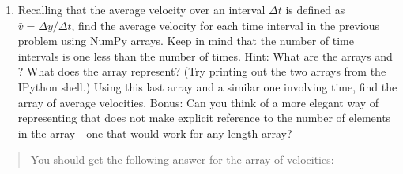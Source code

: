\documentclass[letterpaper,10pt,english]{sphinxmanual}
\begin{document}
\begin{enumerate}
\item {} 
\sphinxAtStartPar
Recalling that the average velocity over an interval \(\Delta t\) is defined as \(\bar{v} = \Delta y/\Delta t\), find the average velocity for each time interval in the previous problem using NumPy arrays.  Keep in mind that the number of time intervals is one less than the number of times.  Hint: What are the arrays  and ?  What does the array  represent?  (Try printing out the two arrays from the IPython shell.) Using this last array and a similar one involving time, find the array of average velocities.  Bonus: Can you think of a more elegant way of representing  that does not make explicit reference to the number of elements in the  array—one that would work for any length array?

\end{enumerate}
\begin{quote}

\sphinxAtStartPar
You should get the following answer for the array of velocities:
\begin{quote}

\begin{sphinxVerbatim}[commandchars=\\\{\},numbers=left,firstnumber=1,stepnumber=1]
\PYG{p}{[}     
\PYG{g+go}{               \PYGZhy{}13.46353913])}
\end{sphinxVerbatim}
\end{quote}
\end{quote}

\sphinxstepscope
\end{document}
